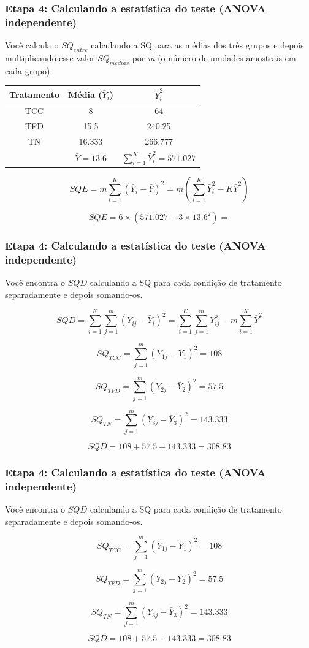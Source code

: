 \documentclass[11pt]{beamer}
\begin{document}
\begin{frame}
\frametitle{Etapa 4: Calculando a estatística do teste (ANOVA independente)}
Você calcula o $SQ_{entre}$ calculando a SQ para as médias dos três grupos e depois multiplicando esse valor $SQ_{medias}$ por \textit{m} (o número de unidades amostrais em cada grupo).

\begin{center}
\begin{tabular}{ccc} 
 \hline
Tratamento & Média ($\bar{Y}_i$) & $\bar{Y}_i^2$\\
 \hline
TCC & 8 & 64 \\
TFD & 15.5 & 240.25 \\
TN  & 16.333 & 266.777 \\
 \hline
 & $\bar{Y}=13.6$ & $\sum_{i=1}^K\bar{Y}_i^2 = 571.027$\\
 \hline
\end{tabular}
\end{center}   
 
\[SQE = m \sum_{i=1}^K(\bar{Y}_i-\bar{Y})^2 = m(\sum_{i=1}^K\bar{Y}_i^2-K\bar{Y}^2)\]

\[SQE =  6 \times (571.027- 3\times 13.6^2) = \]

\end{frame}

\begin{frame}
\frametitle{Etapa 4: Calculando a estatística do teste (ANOVA independente)}
Você encontra o $SQD$ calculando a SQ para cada condição de tratamento separadamente e depois somando-os.

\[SQD = \sum_{i=1}^K\sum_{j=1}^m (Y_{ij}-\bar{Y}_i)^2 = \sum_{i=1}^K\sum_{j=1}^m Y_{ij}^2 -m\sum_{i=1}^K\bar{Y}^2\]

\[SQ_{TCC} = \sum_{j=1}^m (Y_{1j}-\bar{Y}_1)^2 = 108\]

\[SQ_{TFD} = \sum_{j=1}^m (Y_{2j}-\bar{Y}_2)^2 = 57.5\]

\[SQ_{TN} = \sum_{j=1}^m (Y_{3j}-\bar{Y}_3)^2 = 143.333\]

\[SQD = 108+57.5+143.333=308.83\]
\end{frame}

\begin{frame}
\frametitle{Etapa 4: Calculando a estatística do teste (ANOVA independente)}
Você encontra o $SQD$ calculando a SQ para cada condição de tratamento separadamente e depois somando-os.

\[SQ_{TCC} = \sum_{j=1}^m (Y_{1j}-\bar{Y}_1)^2 = 108\]

\[SQ_{TFD} = \sum_{j=1}^m (Y_{2j}-\bar{Y}_2)^2 = 57.5\]

\[SQ_{TN} = \sum_{j=1}^m (Y_{3j}-\bar{Y}_3)^2 = 143.333\]

\[SQD = 108+57.5+143.333=308.83\]
\end{frame}
\end{document}
